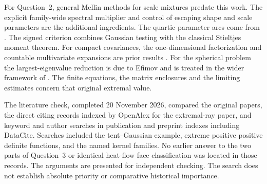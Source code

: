 \documentclass[11pt,a4paper]{article}
\numberwithin{equation}{section}
\begin{document}
For Question~2, general Mellin methods for scale mixtures predate this work. The explicit family-wide spectral multiplier and control of escaping shape and scale parameters are the additional ingredients. The quartic parameter arcs come from \cite{JMR2009}. The signed criterion combines Gaussian testing with the classical Stieltjes moment theorem. For compact covariances, the one-dimensional factorization and countable multivariate expansions are prior results \cite{EGR,GM}. For the spherical problem the largest-eigenvalue reduction is due to Efimov and is treated in the wider framework of \cite{GM}. The finite equations, the matrix enclosures and the limiting estimates concern that original extremal value.

The literature check, completed 20 November 2026, compared the original papers, the direct citing records indexed by OpenAlex for the extremal-ray paper, and keyword and author searches in publication and preprint indexes including DataCite. Searches included the tent--Gaussian example, extreme positive positive definite functions, and the named kernel families. No earlier answer to the two parts of Question~3 or identical heat-flow face classification was located in those records. The arguments are presented for independent checking. The search does not establish absolute priority or comparative historical importance.
\end{document}

